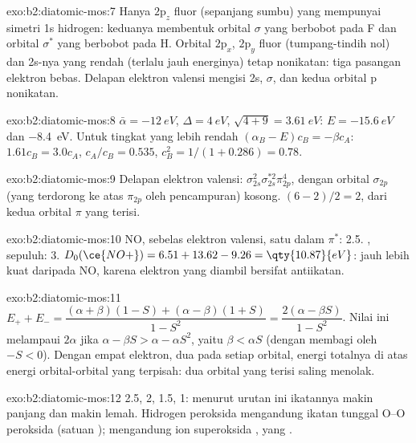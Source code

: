 \begin{solution}{exo:b2:diatomic-mos:7}
Hanya $2\mathrm p_z$ fluor (sepanjang sumbu) yang mempunyai simetri 1s
hidrogen: keduanya membentuk orbital $\sigma$ yang berbobot pada F dan
orbital $\sigma^*$ yang berbobot pada H. Orbital $2\mathrm p_x$, $2\mathrm p_y$
fluor (tumpang-tindih nol) dan 2s-nya yang rendah (terlalu jauh energinya)
tetap nonikatan: tiga pasangan elektron bebas. Delapan elektron valensi
mengisi 2s, $\sigma$, dan kedua orbital p nonikatan.
\end{solution}

\begin{solution}{exo:b2:diatomic-mos:8}
$\bar\alpha = \qty{-12}{eV}$, $\Delta = \qty{4}{eV}$, $\sqrt{4 + 9} = \qty{3.61}{eV}$:
$E = \qty{-15.6}{eV}$ dan \qty{-8.4}{eV}. Untuk tingkat yang lebih rendah
$(\alpha_B - E)c_B = -\beta
c_A$: $1.61c_B = 3.0c_A$, $c_A/c_B = 0.535$,
$c_B^2 = 1/(1 + 0.286) = 0.78$.
\end{solution}

\begin{solution}{exo:b2:diatomic-mos:9}
Delapan elektron valensi: $\sigma_{2s}^2\sigma_{2s}^{*2}\pi_{2p}^4$, dengan
orbital $\sigma_{2p}$ (yang terdorong ke atas $\pi_{2p}$ oleh pencampuran)
kosong.  $(6 - 2)/2 = 2$, dari kedua orbital $\pi$ yang terisi.
\end{solution}

\begin{solution}{exo:b2:diatomic-mos:10}
NO, sebelas elektron valensi, satu dalam $\pi^*$:  2.5.
, sepuluh:  3.
$D_0(\ce{NO+}) = 6.51 + 13.62 - 9.26 = \qty{10.87}{eV}$: jauh lebih kuat
daripada NO, karena elektron yang diambil bersifat antiikatan.
\end{solution}

\begin{solution}{exo:b2:diatomic-mos:11}
$E_+ + E_- = \dfrac{(\alpha + \beta)(1 - S) + (\alpha - \beta)(1 + S)}{1 - S^2} = \dfrac{2(\alpha -
\beta S)}{1 - S^2}$. Nilai ini melampaui $2\alpha$ jika
$\alpha - \beta S > \alpha - \alpha S^2$, yaitu $\beta < \alpha S$ (dengan
membagi oleh $-S < 0$). Dengan empat elektron, dua pada setiap orbital,
energi totalnya di atas energi orbital-orbital yang terpisah: dua orbital
yang terisi saling menolak.
\end{solution}

\begin{solution}{exo:b2:diatomic-mos:12}
 2.5, 2, 1.5, 1: menurut urutan ini ikatannya makin panjang dan
makin lemah. Hidrogen peroksida mengandung ikatan tunggal O--O peroksida
(satuan );  mengandung ion superoksida , yang
.
\end{solution}


